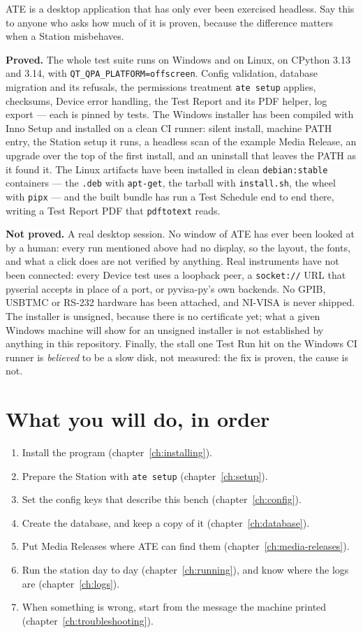 ATE is a desktop application that has only ever been exercised headless. Say this to anyone who
asks how much of it is proven, because the difference matters when a Station misbehaves.

\textbf{Proved.} The whole test suite runs on Windows and on Linux, on CPython 3.13 and 3.14,
with \texttt{QT\_QPA\_PLATFORM=offscreen}. Config validation, database migration and its refusals,
the permissions treatment \texttt{ate setup} applies, checksums, Device error handling, the Test
Report and its PDF helper, log export --- each is pinned by tests. The Windows installer has been
compiled with Inno Setup and installed on a clean CI runner: silent install, machine PATH entry,
the Station setup it runs, a headless scan of the example Media Release, an upgrade over the top
of the first install, and an uninstall that leaves the PATH as it found it. The Linux artifacts
have been installed in clean \texttt{debian:stable} containers --- the \texttt{.deb} with
\texttt{apt-get}, the tarball with \texttt{install.sh}, the wheel with \texttt{pipx} --- and the
built bundle has run a Test Schedule end to end there, writing a Test Report PDF that
\texttt{pdftotext} reads.

\textbf{Not proved.} A real desktop session. No window of ATE has ever been looked at by a
human: every run mentioned above had no display, so the layout, the fonts, and what a click
does are not verified by anything. Real instruments have not been connected: every Device test
uses a loopback peer, a \texttt{socket://} URL that pyserial accepts in place of a port, or
pyvisa-py's own backends. No GPIB, USBTMC or RS-232 hardware has been attached, and NI-VISA is
never shipped. The installer is unsigned, because there is no certificate yet; what a given
Windows machine will show for an unsigned installer is not established by anything in this
repository. Finally, the stall one Test Run hit on the Windows CI runner is
\emph{believed} to be a slow disk, not measured: the fix is proven, the cause is not.

\section{What you will do, in order}

\begin{enumerate}
  \item Install the program (chapter~\ref{ch:installing}).
  \item Prepare the Station with \texttt{ate setup} (chapter~\ref{ch:setup}).
  \item Set the config keys that describe this bench (chapter~\ref{ch:config}).
  \item Create the database, and keep a copy of it (chapter~\ref{ch:database}).
  \item Put Media Releases where ATE can find them (chapter~\ref{ch:media-releases}).
  \item Run the station day to day (chapter~\ref{ch:running}), and know where the logs are
    (chapter~\ref{ch:logs}).
  \item When something is wrong, start from the message the machine printed
    (chapter~\ref{ch:troubleshooting}).
\end{enumerate}

